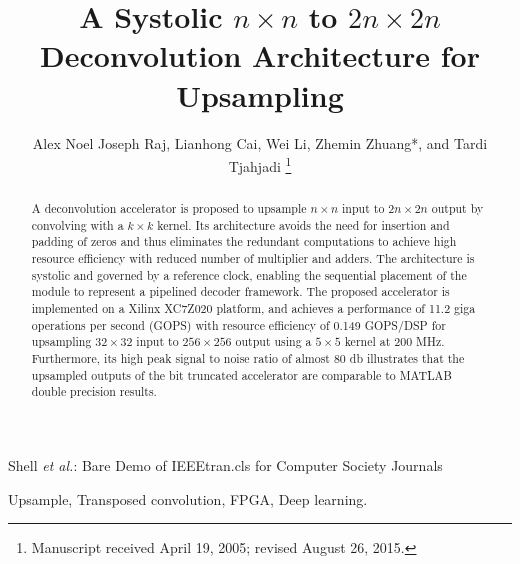 \documentclass[journal]{IEEEtran}
\begin{document}
\title{A Systolic $n \times n$ to $2n \times 2n$ Deconvolution Architecture for Upsampling}

\author{Alex Noel Joseph Raj,
        Lianhong Cai,
        Wei Li,
        Zhemin Zhuang*,
        and Tardi Tjahjadi
\thanks{Manuscript received April 19, 2005; revised August 26, 2015.}}


%
{Shell \MakeLowercase{\textit{et al.}}: Bare Demo of IEEEtran.cls for Computer Society Journals}






\maketitle


\IEEEpeerreviewmaketitle
\begin{abstract}
A  deconvolution accelerator is proposed to upsample $n\times n$ input to $2n\times2n$ output by convolving with a $k\times k$ kernel. Its architecture avoids the need for insertion and padding of zeros and thus eliminates the redundant computations to achieve high resource efficiency with reduced number of multiplier and adders. The architecture is systolic and governed by a reference clock, enabling the sequential placement of the module to represent a pipelined decoder framework. The proposed  accelerator is implemented on a Xilinx XC7Z020 platform, and achieves a performance of 11.2 giga operations per second (GOPS) with resource efficiency of 0.149 GOPS/DSP for upsampling $32\times32$ input to $256\times256$ output using a $5\times5$ kernel at $200$ MHz. Furthermore, its high peak signal to noise ratio of almost  80 db illustrates that the upsampled outputs of the bit truncated accelerator are comparable to MATLAB double precision results.
\end{abstract}

\begin{IEEEkeywords}
Upsample, Transposed convolution, FPGA, Deep learning.
\end{IEEEkeywords}
\end{document}
